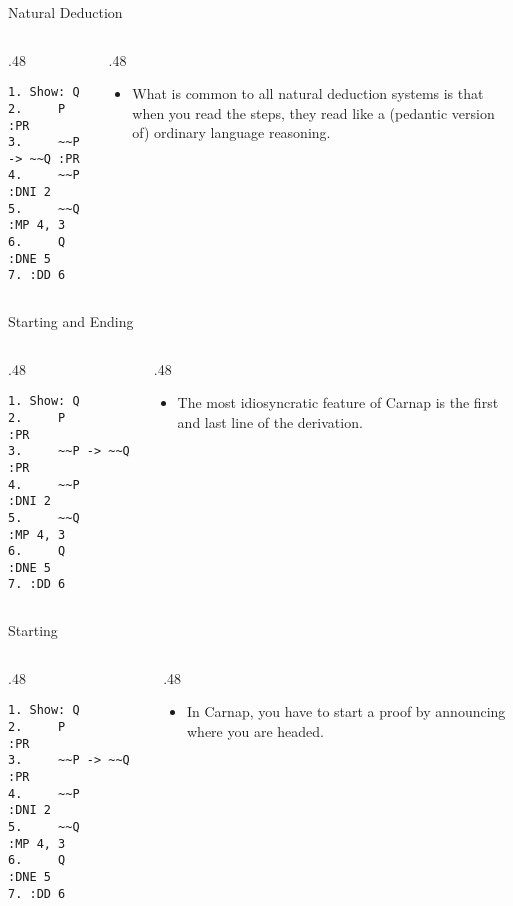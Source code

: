 \documentclass[
  ignorenonframetext,
]{beamer}
\providecommand{\tightlist}{%
  \setlength{\itemsep}{0pt}\setlength{\parskip}{0pt}}
\renewcommand{\,}{\text{, }}
\def\begincols{\begin{columns}}
\def\begincol{\begin{column}}
\def\endcol{\end{column}}
\def\endcols{\end{columns}}
\begin{document}
\begin{frame}[fragile]{Natural Deduction}
\protect\hypertarget{natural-deduction-1}{}

\begincols
\begincol{.48\textwidth}

\begin{verbatim}
1. Show: Q
2.     P          :PR
3.     ~~P -> ~~Q :PR
4.     ~~P        :DNI 2
5.     ~~Q        :MP 4, 3
6.     Q          :DNE 5
7. :DD 6
\end{verbatim}

\endcol
\begincol{.48\textwidth}

\begin{itemize}
\tightlist
\item
  What is common to all natural deduction systems is that when you read
  the steps, they read like a (pedantic version of) ordinary language
  reasoning.
\end{itemize}

\endcol
\endcols

\end{frame}

\begin{frame}[fragile]{Starting and Ending}
\protect\hypertarget{starting-and-ending}{}

\begincols
\begincol{.48\textwidth}

\begin{verbatim}
1. Show: Q
2.     P          :PR
3.     ~~P -> ~~Q :PR
4.     ~~P        :DNI 2
5.     ~~Q        :MP 4, 3
6.     Q          :DNE 5
7. :DD 6
\end{verbatim}

\endcol
\begincol{.48\textwidth}

\begin{itemize}
\tightlist
\item
  The most idiosyncratic feature of Carnap is the first and last line of
  the derivation.
\end{itemize}

\endcol
\endcols

\end{frame}

\begin{frame}[fragile]{Starting}
\protect\hypertarget{starting}{}

\begincols
\begincol{.48\textwidth}

\begin{verbatim}
1. Show: Q
2.     P          :PR
3.     ~~P -> ~~Q :PR
4.     ~~P        :DNI 2
5.     ~~Q        :MP 4, 3
6.     Q          :DNE 5
7. :DD 6
\end{verbatim}

\endcol
\begincol{.48\textwidth}

\begin{itemize}
\tightlist
\item
  In Carnap, you have to start a proof by announcing where you are
  headed.
\end{itemize}

\endcol
\endcols

\end{frame}
\end{document}

